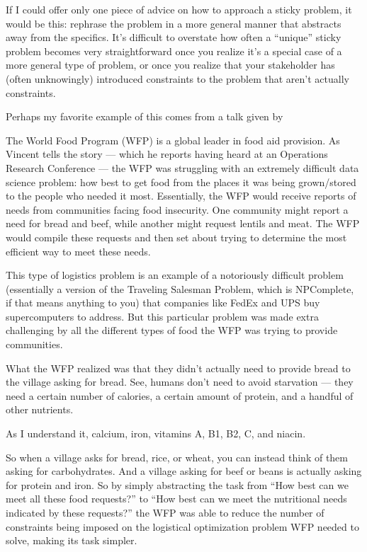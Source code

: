 \documentclass[letterpaper,10pt,english]{jupyterBook}
\begin{document}
\sphinxAtStartPar
If I could offer only one piece of advice on how to approach a sticky problem, it would be this: rephrase the problem in a more general manner that abstracts away from the specifics. It’s difficult to overstate how often a “unique” sticky problem becomes very straightforward once you realize it’s a special case of a more general type of problem, or once you realize that your stakeholder has (often unknowingly) introduced constraints to the problem that aren’t actually constraints.

\sphinxAtStartPar
Perhaps my favorite example of this comes from a talk given by 

\sphinxAtStartPar
The World Food Program (WFP) is a global leader in food aid provision. As Vincent tells the story — which he reports having heard at an Operations Research Conference — the WFP was struggling with an extremely difficult data science problem: how best to get food from the places it was being grown/stored to the people who needed it most. Essentially, the WFP would receive reports of needs from communities facing food insecurity. One community might report a need for bread and beef, while another might request lentils and meat. The WFP would compile these requests and then set about trying to determine the most efficient way to meet these needs.

\sphinxAtStartPar
This type of logistics problem is an example of a notoriously difficult problem (essentially a version of the Traveling Salesman Problem, which is NP\sphinxhyphen{}Complete, if that means anything to you) that companies like FedEx and UPS buy supercomputers to address. But this particular problem was made extra challenging by all the different types of food the WFP was trying to provide communities.

\sphinxAtStartPar
What the WFP realized was that they didn’t actually need to provide bread to the village asking for bread. See, humans don’t need  to avoid starvation — they need a certain number of calories, a certain amount of protein, and a handful of other nutrients.%
\begin{footnote}[4]\sphinxAtStartFootnote
As I understand it, calcium, iron, vitamins A, B1, B2, C, and niacin.
%
\end{footnote} So when a village asks for bread, rice, or wheat, you can instead think of them asking for carbohydrates. And a village asking for beef or beans is actually asking for protein and iron. So by simply abstracting the task from “How best can we meet all these food requests?” to “How best can we meet the nutritional needs indicated by these requests?” the WFP was able to  reduce the number of constraints being imposed on the logistical optimization problem WFP needed to solve, making its task  simpler.
\end{document}

